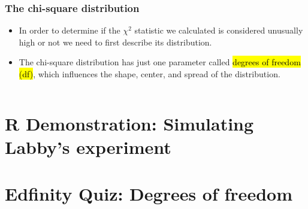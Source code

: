 \documentclass[slidestop,compress,mathserif]{beamer}
\begin{document}

\begin{frame}
\frametitle{The chi-square distribution}

\begin{itemize}

\item In order to determine if the $\chi^2$ statistic we calculated is considered unusually high or not we need to first describe its distribution.

\pause

\item The chi-square distribution has just one parameter called \hl{degrees of freedom (df)}, which influences the shape, center, and spread of the distribution. \\

\end{itemize}

\pause

$\:$ \\


\end{frame}


\section{R Demonstration: Simulating Labby's experiment}


\section{Edfinity Quiz: Degrees of freedom}

\end{document}
